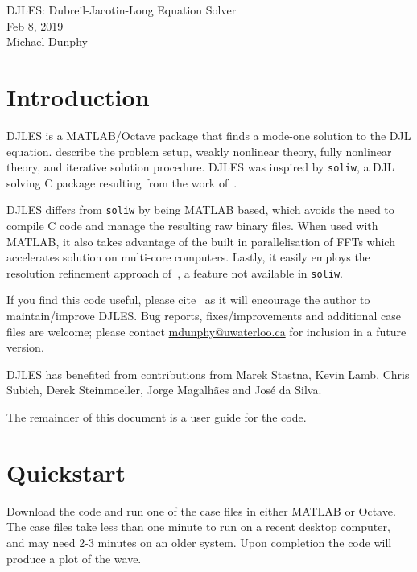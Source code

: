\documentclass[letterpaper]{article}
\begin{document}
\newpage
\pagestyle{plain}
\setcounter{page}{1}

\begin{center}
\huge{DJLES: Dubreil-Jacotin-Long Equation Solver}\\[1em]
\large{Feb 8, 2019}\\
Michael Dunphy
\end{center}

\section{Introduction}
DJLES is a MATLAB/Octave package that finds a mode-one solution to the DJL equation. \cite{StastnaLamb2002} describe the problem setup, weakly nonlinear theory, fully nonlinear theory, and iterative solution procedure. DJLES was inspired by \verb+soliw+, a DJL solving C package resulting from the work of~\cite{StastnaLamb2002}.

DJLES differs from \verb+soliw+ by being MATLAB based, which avoids the need to compile C code and manage the resulting raw binary files. When used with MATLAB, it also takes advantage of the built in parallelisation of FFTs which accelerates solution on multi-core computers. Lastly, it easily employs the resolution refinement approach of~\cite{DunphySubichStastna2011}, a feature not available in \verb+soliw+.

If you find this code useful, please cite~\cite{DunphySubichStastna2011} as it will encourage the author to maintain/improve DJLES. Bug reports, fixes/improvements and additional case files are welcome; please contact \href{mailto:mdunphy@uwaterloo.ca}{mdunphy@uwaterloo.ca} for inclusion in a future version.

DJLES has benefited from contributions from Marek Stastna, Kevin Lamb, Chris Subich, Derek Steinmoeller, Jorge Magalh\~aes and Jos\'e da Silva.

The remainder of this document is a user guide for the code.

\section{Quickstart}
Download the code and run one of the case files in either MATLAB or Octave. The case files take less than one minute to run on a recent desktop computer, and may need 2-3 minutes on an older system. Upon completion the code will produce a plot of the wave.
\end{document}
